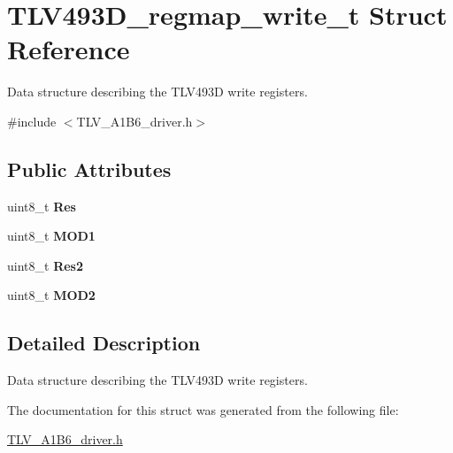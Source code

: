 \hypertarget{struct_t_l_v493_d__regmap__write__t}{}\section{T\+L\+V493\+D\+\_\+regmap\+\_\+write\+\_\+t Struct Reference}
\label{struct_t_l_v493_d__regmap__write__t}


Data structure describing the T\+L\+V493D write registers.  




{\ttfamily \#include $<$T\+L\+V\+\_\+\+A1\+B6\+\_\+driver.\+h$>$}

\subsection*{Public Attributes}
\begin{DoxyCompactItemize}
\item 
\mbox{\label{struct_t_l_v493_d__regmap__write__t_a0ca975ab96e4f07ab7d442da15859aa1}} 
uint8\+\_\+t {\bfseries Res}
\item 
\mbox{\label{struct_t_l_v493_d__regmap__write__t_a26bb6c01127be55f997c705232707c18}} 
uint8\+\_\+t {\bfseries M\+O\+D1}
\item 
\mbox{\label{struct_t_l_v493_d__regmap__write__t_aa89cf0ba7ae642c65df72bce7c9600d3}} 
uint8\+\_\+t {\bfseries Res2}
\item 
\mbox{\label{struct_t_l_v493_d__regmap__write__t_af6a4bc21898ed94c68cf7800b387f7c2}} 
uint8\+\_\+t {\bfseries M\+O\+D2}
\end{DoxyCompactItemize}


\subsection{Detailed Description}
Data structure describing the T\+L\+V493D write registers. 

The documentation for this struct was generated from the following file\+:\begin{DoxyCompactItemize}
\item 
\mbox{\hyperlink{_t_l_v___a1_b6__driver_8h}{T\+L\+V\+\_\+\+A1\+B6\+\_\+driver.\+h}}\end{DoxyCompactItemize}
